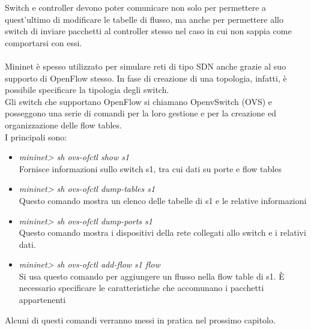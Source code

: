 Switch e controller devono poter comunicare non solo per permettere a quest'ultimo di modificare le tabelle di flusso, ma anche per permettere allo switch di inviare pacchetti al controller stesso nel caso in cui non sappia come comportarsi con essi. \cite{of}\\\\
Mininet è spesso utilizzato per simulare reti di tipo SDN anche grazie al suo supporto di OpenFlow stesso. In fase di creazione di una topologia, infatti, è possibile specificare la tipologia degli switch.\\
Gli switch che supportano OpenFlow si chiamano OpenvSwitch (OVS) e posseggono una serie di comandi per la loro gestione e per la creazione ed organizzazione delle flow tables.\\
I principali sono:
\begin{itemize}
	\item \textit{mininet> sh ovs-ofctl show s1}\\
	Fornisce informazioni sullo switch s1, tra cui dati su porte e flow tables
	\item \textit{mininet> sh ovs-ofctl dump-tables s1}\\
	Questo comando mostra un elenco delle tabelle di s1 e le relative informazioni
	\item \textit{mininet> sh ovs-ofctl dump-ports s1}\\
	Questo comando mostra i dispositivi della rete collegati allo switch e i relativi dati.
	\item \textit{mininet> sh ovs-ofctl add-flow s1 flow}\\
	Si usa questo comando per aggiungere un flusso nella flow table di s1. È necessario specificare le caratteristiche che accomunano i pacchetti appartenenti
\end{itemize}
Alcuni di questi comandi verranno messi in pratica nel prossimo capitolo. \cite{ovs}

